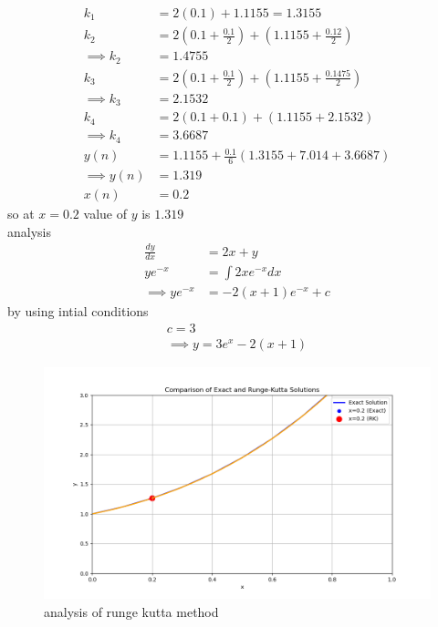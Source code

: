 \documentclass[journal,12pt,twocolumn]{IEEEtran}
\theoremstyle{remark}
\begin{document}
\begin{align}
    k_1&=2(0.1)+1.1155=1.3155\\
    k_2&=2(0.1+\frac{0.1}{2})+(1.1155+\frac{0.12}{2})\\
    \implies k_2&= 1.4755\\
    k_3&=2(0.1+\frac{0.1}{2})+(1.1155+\frac{0.1475}{2})\\
    \implies k_3&=2.1532\\
    k_4&=2(0.1+0.1)+(1.1155+2.1532)\\
    \implies k_4&=3.6687\\
    y(n) &=1.1155+\frac{0.1}{6}(1.3155+7.014+3.6687)\\
     \implies y(n)&=1.319\\
     x(n)&=0.2
\end{align}
so at $x=0.2$ value of $y$ is $1.319$\\
analysis
\begin{align}
\frac{dy}{dx}&=2x+y\\
ye^{-x}&=\int2xe^{-x}dx\\
\implies ye^{-x}&=-2(x+1)e^{-x}+c
\end{align}
by using intial conditions
\begin{align}
c=3\\
\implies y=3e^x-2(x+1)
\end{align}
\begin{figure}[h!]
    \centering
    \includegraphics[width=1.1\linewidth]{figs/analysis.png}
    \caption{analysis of runge kutta method}
    \label{ag50.1}
\end{figure}
\end{document}
